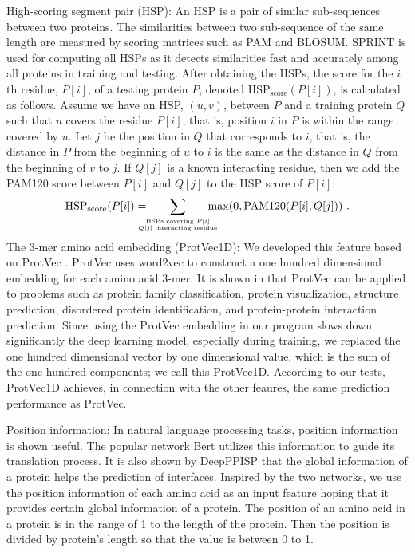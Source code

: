 \documentclass{bioinfo}
\begin{document}
\begin{methods}
High-scoring segment pair (HSP): An HSP is a pair of similar sub-sequences between two proteins. The similarities between two sub-sequence of the same length are measured by scoring matrices such as PAM and BLOSUM. SPRINT \citep{li2017sprint} is used for computing all HSPs as it detects similarities fast and accurately among all proteins in training and testing. After obtaining the HSPs, the score for the $i$th residue, $P[i]$, of a testing protein $P$, denoted $\text{HSP}_{\text{score}}(P[i])$, is calculated as follows. Assume we have an HSP, $(u,v)$, between $P$ and a training protein $Q$ such that $u$ covers the residue $P[i]$, that is, position $i$ in $P$ is within the range covered by $u$. Let $j$ be the position in $Q$ that corresponds to $i$, that is, the distance in $P$ from the beginning of $u$ to $i$ is the same as the distance in $Q$ from the beginning of $v$ to $j$. If $Q[j]$ is a known interacting residue, then we add the PAM120 score between $P[i]$ and $Q[j]$ to the HSP score of $P[i]$:
\[
\text{HSP}_{\text{score}}(P[i]) = \!\!\!\!\!\!\sum_{\stackrel{\text{\tiny HSPs covering $P[i]$}}{\text{\tiny $Q[j]$ interacting residue}}}\!\!\!\!\!\! \max(0, \text{PAM120}(P[i], Q[j])) \ .
\]
The 3-mer amino acid embedding (ProtVec1D): We developed this feature based on ProtVec \citep{asgari2015continuous}. ProtVec uses word2vec \citep{mikolov2013distributed} to construct a one hundred dimensional embedding for each amino acid 3-mer. It is shown in \citep{asgari2015continuous} that ProtVec can be applied to problems such as protein family classification, protein visualization, structure prediction, disordered protein identification, and protein-protein interaction prediction. Since using the ProtVec embedding in our program slows down significantly the deep learning model, especially during training, we replaced the one hundred dimensional vector by one dimensional value, which is the sum of the one hundred components; we call this ProtVec1D. According to our tests, ProtVec1D achieves, in connection with the other feaures, the same prediction performance as ProtVec.

Position information: In natural language processing tasks, position information is shown useful. The popular network Bert \citep{devlin2018bert} utilizes this information to guide its translation process. It is also shown by DeepPPISP \citep{zeng2019protein} that the global information of a protein helps the prediction of interfaces. Inspired by the two networks, we use the position information of each amino acid as an input feature hoping that it provides certain global information of a protein. The position of an amino acid in a protein is in the range of 1 to the length of the protein. Then the position is divided by protein's length so that the value is between 0 to 1.


\end{methods}
\end{document}
